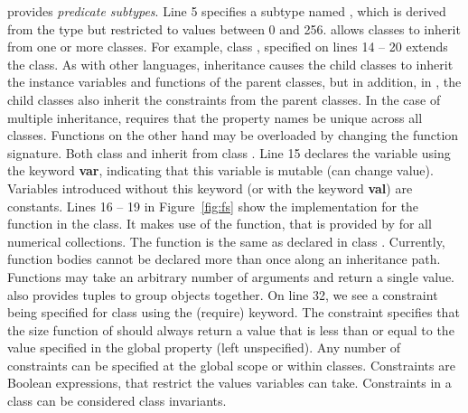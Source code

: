 \noindent \Klang{} provides {\em predicate subtypes}. Line 5 specifies
a subtype named , which is derived from the  type
but restricted to values between 0 and 256. \Klang{} allows classes to
inherit from one or more classes. For example, class ,
specified on lines 14 -- 20 extends the  class. As with
other languages, inheritance causes the child classes to inherit the
instance variables and functions of the parent classes, but in
addition, in \Klang{}, the child classes also inherit the constraints
from the parent classes. In the case of multiple inheritance, \Klang{}
requires that the property names be unique across all
classes. Functions on the other hand may be overloaded by changing the
function signature. Both class  and  inherit from
class . 
Line 15 declares the variable  using the keyword {\bf var},
indicating that this variable is mutable (can change value). Variables introduced
without this keyword (or with the keyword {\bf val}) are constants.
Lines 16 -- 19 in Figure~\ref{fig:fs} show the
implementation for the  function in the 
class. It makes use of the  function, that is provided by
\Klang{} for all numerical collections. The  function is
the same as declared in class . Currently, function bodies
cannot be declared more than once along an inheritance path. Functions
may take an arbitrary number of arguments and return a single
value. \Klang{} also provides tuples to group objects together. On
line 32, we see a constraint being specified for class 
using the  (require) keyword. The constraint specifies that
the size function of  should always return a value that is
less than or equal to the value specified in the global property
 (left unspecified). Any number of constraints
can be specified at the global scope or within classes. Constraints
are Boolean expressions, that restrict the values variables can
take. Constraints in a class can be considered class invariants.


